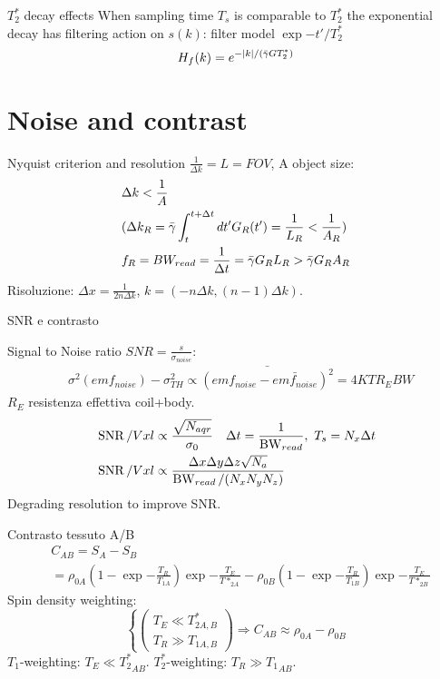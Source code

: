 \begin{frame}{$T_2^*$ decay effects}
When sampling time $T_s$ is comparable to $T_2^*$ the exponential decay has filtering action on $s(k)$: filter model $\exp{-t'/T_2^*}$
\begin{equation*}
H_f(k)=\exp{-|k|/(\gammabar GT_2^*)}
\end{equation*}
\end{frame}

\section{Noise and contrast}

\begin{frame}{Nyquist criterion and resolution}
$\frac{1}{\Delta k}=L=FOV$, A object size:
\begin{align*}
&\Delta k<\frac{1}{A}\\
&(\Delta k_R=\gammabar\int_t^{t+\Delta t}d t'G_R(t')=\frac{1}{L_R}<\frac{1}{A_R})\\
&f_R=BW_{read}=\frac{1}{\Delta t}=\gammabar G_RL_R>\gammabar G_RA_R
\end{align*}
Risoluzione: $\Delta x=\frac{1}{2n\Delta k}$, $k=(-n\Delta k,(n-1)\Delta k)$.
\end{frame}

\begin{frame}[allowframebreaks]{SNR e contrasto}
\begin{block}{Signal to Noise ratio}
$SNR=\frac{s}{\sigma_{noise}}$:
\begin{align*}
&\sigma^2(emf_{noise})-\sigma_{TH}^2\propto\bar{(emf_{noise}-\bar{emf_{noise}})^2}=4KTR_EBW
\end{align*}
$R_E$ resistenza effettiva coil+body.
\begin{align*}
&\operatorname{SNR}/Vxl\propto\frac{\sqrt{N_{aqr}}}{\sigma_0}\quad \Delta t= \frac{1}{\operatorname{BW}_{read}},\ T_s=N_x\Delta t\\
&\operatorname{SNR}/Vxl\propto \frac{\Delta x\Delta y\Delta z\sqrt{N_a}}{\operatorname{BW}_{read}/(N_xN_yN_z)}
\end{align*}
Degrading resolution to improve SNR.
\end{block}
\begin{block}{Contrasto tessuto A/B}
\begin{align*}
&C_{AB}=S_A-S_B\\
&=\rho_{0A}(1-\exp{-\frac{T_R}{T_{1A}}})\exp{-\frac{T_E}{T*_{2A}}}-\rho_{0B}(1-\exp{-\frac{T_R}{T_{1B}}})\exp{-\frac{T_E}{T*_{2B}}}
\end{align*}
Spin density weighting:
\begin{equation*}
\left\{\begin{pmatrix}T_E\ll T_{2A,B}^*\\ T_R\gg T_{1A,B}\end{pmatrix}\right.\Rightarrow C_{AB}\approx\rho_{0A}-\rho_{0B}
\end{equation*}
$T_1$-weighting: $T_E\ll {T_2^*}_{AB}$.
$T_2^*$-weighting: $T_R\gg {T_1}_{AB}$.
\end{block}
\end{frame}